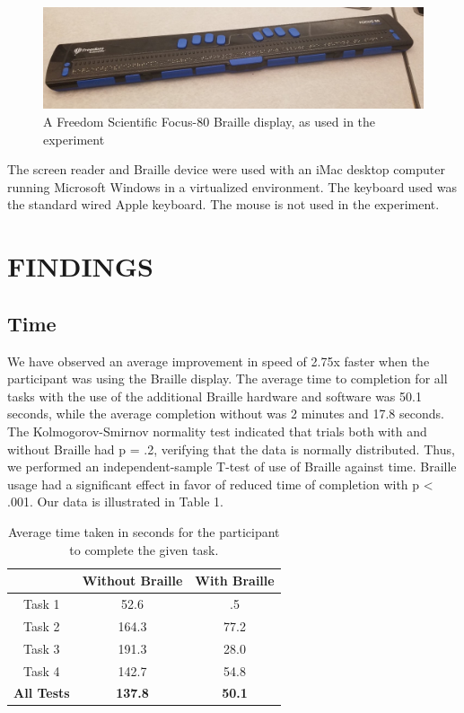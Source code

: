 \documentclass[11.5pt]{sig-alternate} %
\begin{document}
\begin{large}
\begin{figure}[!h]
    \centering
    \includegraphics[width=1\linewidth]{images/fig3.jpg}
    \caption{A Freedom Scientific Focus-80 Braille display, as used in the experiment}
\end{figure}

\newpage

The screen reader and Braille device were used with an iMac desktop computer running Microsoft Windows in a virtualized environment. The keyboard used was the standard wired Apple keyboard. The mouse is not used in the experiment.

\section*{FINDINGS}

\subsection*{Time}

We have observed an average improvement in speed of 2.75x faster when the participant was using the Braille display. The average time to completion for all tasks with the use of the additional Braille hardware and software was 50.1 seconds, while the average completion without was 2 minutes and 17.8 seconds. The Kolmogorov-Smirnov normality test indicated that trials both with and without Braille had p = .2, verifying that the data is normally distributed. Thus, we performed an independent-sample T-test of use of Braille against time. Braille usage had a significant effect in favor of reduced time of completion with p < .001. Our data is illustrated in Table 1.

\begin{table}[h]
\caption{Average time taken in seconds for the participant to complete the given task.}
\begin{tabular}{ccc}
 & \textbf{Without Braille} & \textbf{With Braille} \\ \hline
Task 1 & 52.6 & .5 \\
Task 2 & 164.3 & 77.2 \\
Task 3 & 191.3 & 28.0 \\
Task 4 & 142.7 & 54.8 \\ \hline
\textbf{All Tests} & \textbf{137.8} & \textbf{50.1} \\
\end{tabular}
\end{table}


\end{large}
\end{document}
